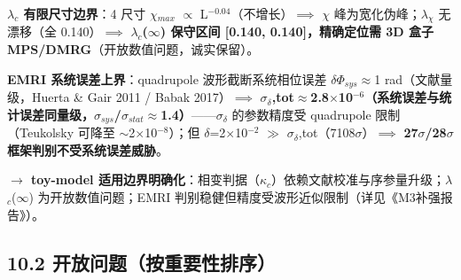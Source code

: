 \documentclass[12pt]{article}
\newcommand{\up}[1]{\ensuremath{^{#1}}}
\newcommand{\down}[1]{\ensuremath{_{#1}}}
\begin{document}
\textbf{\ensuremath{\lambda}\down{c} 有限尺寸边界}：4 尺寸 \ensuremath{\chi}\down{max} \ensuremath{\propto} L\up{-0.04}（不增长）\ensuremath{\implies} \ensuremath{\chi} 峰为宽化伪峰；\ensuremath{\lambda}\down{\chi{}} 无漂移（全 0.140）\ensuremath{\implies} \textbf{\ensuremath{\lambda}\down{c}(\ensuremath{\infty}) 保守区间 [0.140, 0.140]，精确定位需 3D 盒子 MPS/DMRG}（开放数值问题，诚实保留）。

\textbf{EMRI 系统误差上界}：quadrupole 波形截断系统相位误差 \ensuremath{\delta}\ensuremath{\Phi}\down{sys}\ensuremath{\approx}1 rad（文献量级，Huerta \& Gair 2011 / Babak 2017）\ensuremath{\implies} \textbf{\ensuremath{\sigma}\down{\delta{}},tot\ensuremath{\approx}2.8\ensuremath{\times}10\up{-6}（系统误差与统计误差同量级，\ensuremath{\sigma}\down{sys}/\ensuremath{\sigma}\down{stat}\ensuremath{\approx}1.4）}------\ensuremath{\sigma}\down{\delta{}} 的参数精度受 quadrupole 限制（Teukolsky 可降至 \ensuremath{\sim}2\ensuremath{\times}10\up{-8}）；但 \ensuremath{\delta}=2\ensuremath{\times}10\up{-2} \ensuremath{\gg} \ensuremath{\sigma}\down{\delta{}},tot（7108\ensuremath{\sigma}）\ensuremath{\implies} \textbf{27\ensuremath{\sigma}/28\ensuremath{\sigma} 框架判别不受系统误差威胁}。

\textbf{\ensuremath{\to} toy-model 适用边界明确化}：相变判据（\ensuremath{\kappa}\down{c}）依赖文献校准与序参量升级；\ensuremath{\lambda}\down{c}(\ensuremath{\infty}) 为开放数值问题；EMRI 判别稳健但精度受波形近似限制（详见《M3补强报告》）。

\subsection{10.2 开放问题（按重要性排序）}
\end{document}
